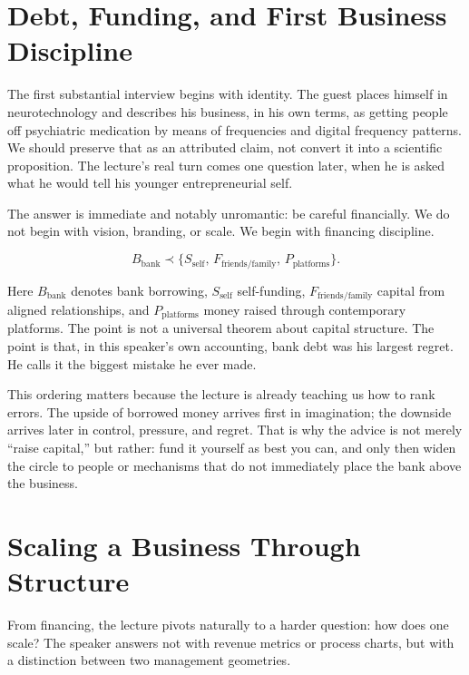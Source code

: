 \section{Debt, Funding, and First Business Discipline}

The first substantial interview begins with identity. The guest places himself in neurotechnology and describes his business, in his own terms, as getting people off psychiatric medication by means of frequencies and digital frequency patterns. We should preserve that as an attributed claim, not convert it into a scientific proposition. The lecture's real turn comes one question later, when he is asked what he would tell his younger entrepreneurial self.

The answer is immediate and notably unromantic: be careful financially. We do not begin with vision, branding, or scale. We begin with financing discipline.

\begin{equation}
B_{\mathrm{bank}} \prec \{S_{\mathrm{self}},\,F_{\mathrm{friends/family}},\,P_{\mathrm{platforms}}\}.
\end{equation}

Here \(B_{\mathrm{bank}}\) denotes bank borrowing, \(S_{\mathrm{self}}\) self-funding, \(F_{\mathrm{friends/family}}\) capital from aligned relationships, and \(P_{\mathrm{platforms}}\) money raised through contemporary platforms. The point is not a universal theorem about capital structure. The point is that, in this speaker's own accounting, bank debt was his largest regret. He calls it the biggest mistake he ever made.

This ordering matters because the lecture is already teaching us how to rank errors. The upside of borrowed money arrives first in imagination; the downside arrives later in control, pressure, and regret. That is why the advice is not merely ``raise capital,'' but rather: fund it yourself as best you can, and only then widen the circle to people or mechanisms that do not immediately place the bank above the business.

\section{Scaling a Business Through Structure}

From financing, the lecture pivots naturally to a harder question: how does one scale? The speaker answers not with revenue metrics or process charts, but with a distinction between two management geometries.

